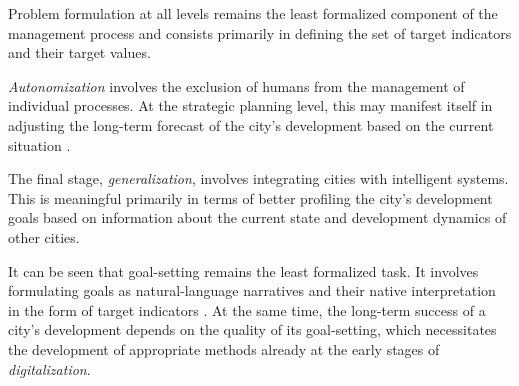 Problem formulation at all levels remains the least formalized component of the management process and consists primarily in defining the set of target indicators and their target values.

\emph{Autonomization} involves the exclusion of humans from the management of individual processes.
At the strategic planning level, this may manifest itself in adjusting the long-term forecast of the city's development based on the current situation \cite{x12}.

The final stage, \emph{generalization}, involves integrating cities with intelligent systems.
This is meaningful primarily in terms of better profiling the city's development goals based on information about the current state and development dynamics of other cities.

It can be seen that goal-setting remains the least formalized task.
It involves formulating goals as natural-language narratives and their native interpretation in the form of target indicators \cite{x13}.
At the same time, the long-term success of a city's development depends on the quality of its goal-setting, which necessitates the development of appropriate methods already at the early stages of \emph{digitalization}.